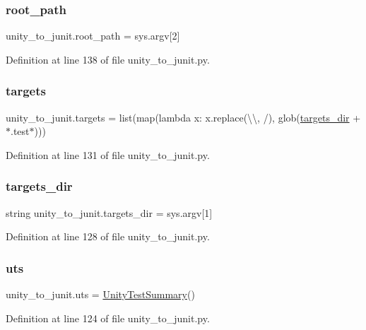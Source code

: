 \subsubsection{\texorpdfstring{root\+\_\+path}{root\_path}}
{\footnotesize\ttfamily unity\+\_\+to\+\_\+junit.\+root\+\_\+path = sys.\+argv\mbox{[}2\mbox{]}}



Definition at line 138 of file unity\+\_\+to\+\_\+junit.\+py.

\mbox{\label{namespaceunity__to__junit_af34ff74a0b45d670df96094c5a4a980f}} 
\subsubsection{\texorpdfstring{targets}{targets}}
{\footnotesize\ttfamily unity\+\_\+to\+\_\+junit.\+targets = list(map(lambda x\+: x.\+replace(\textquotesingle{}\textbackslash{}\textbackslash{}\textquotesingle{}, \textquotesingle{}/\textquotesingle{}), glob(\hyperlink{namespaceunity__to__junit_a634333f9ba8cf5223dbef34ba1d02a6d}{targets\+\_\+dir} + \textquotesingle{}$\ast$.test$\ast$\textquotesingle{})))}



Definition at line 131 of file unity\+\_\+to\+\_\+junit.\+py.

\mbox{\label{namespaceunity__to__junit_a634333f9ba8cf5223dbef34ba1d02a6d}} 
\subsubsection{\texorpdfstring{targets\+\_\+dir}{targets\_dir}}
{\footnotesize\ttfamily string unity\+\_\+to\+\_\+junit.\+targets\+\_\+dir = sys.\+argv\mbox{[}1\mbox{]}}



Definition at line 128 of file unity\+\_\+to\+\_\+junit.\+py.

\mbox{\label{namespaceunity__to__junit_a46316a5263d07e5ef88fa5eeef20f41b}} 
\subsubsection{\texorpdfstring{uts}{uts}}
{\footnotesize\ttfamily unity\+\_\+to\+\_\+junit.\+uts = \hyperlink{classunity__to__junit_1_1_unity_test_summary}{Unity\+Test\+Summary}()}



Definition at line 124 of file unity\+\_\+to\+\_\+junit.\+py.

